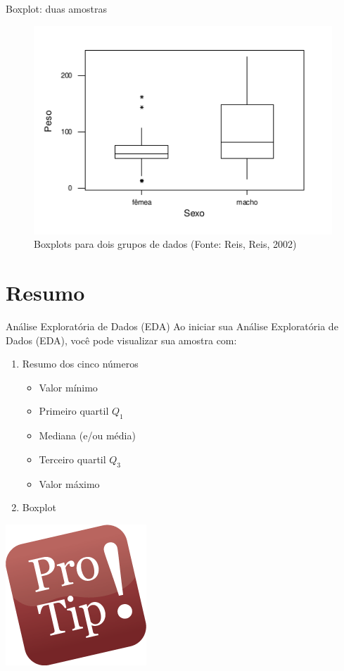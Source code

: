 \documentclass{beamer}
\begin{document}
\begin{frame}{Boxplot: duas amostras}
  \begin{figure}
    \centering
    \includegraphics[height=0.7\textheight]{Desc_II/boxplot3}
    \caption{Boxplots para dois grupos de dados (Fonte: Reis, Reis,
      2002)}
  \end{figure}
\end{frame}

\section{Resumo}

\begin{frame}{Análise Exploratória de Dados (EDA)}
  Ao iniciar sua Análise Exploratória de Dados (EDA), você pode
  visualizar sua amostra com:
  \begin{enumerate}
  \item Resumo dos cinco números
    \begin{itemize}
    \item Valor mínimo
    \item Primeiro quartil $Q_1$
    \item Mediana (e/ou média)
    \item Terceiro quartil $Q_3$
    \item Valor máximo
    \end{itemize}
  \item Boxplot
  \end{enumerate}
  \begin{center}
  \includegraphics[height=0.2\textheight]{Desc_II/protip}
  \end{center}
\end{frame}
\end{document}
